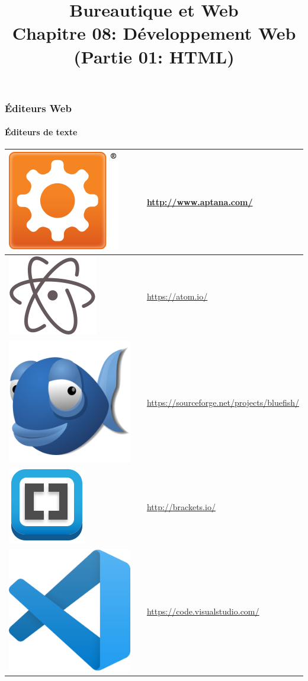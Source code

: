 \documentclass[xcolor=table]{beamer}
\title[BWEB: 08- Web (HTML)] %
{Bureautique et Web \\Chapitre 08: Développement Web (Partie 01: HTML)}
\begin{document}
\begin{frame}
\frametitle{Éditeurs Web}
\framesubtitle{Éditeurs de texte}

\def\arraystretch{0}

\begin{tabular}{p{}cp{}}%
	
	\hline
	
	\includegraphics[height=.8cm]{..//img/Bweb08-dev-web/aptana-logo.png} &
	& 
	\url{http://www.aptana.com/}\\
	
	\hline
	
	\includegraphics[height=.8cm]{..//img/Bweb08-dev-web/atom-logo.png} &
	& 
	\url{https://atom.io/}\\
	
	\hline
	
	\includegraphics[height=.8cm]{..//img/Bweb08-dev-web/bluefish-logo.png} &
	& 
	\url{https://sourceforge.net/projects/bluefish/}\\
	
	\hline
	
	\includegraphics[height=.8cm]{..//img/Bweb08-dev-web/brackets-logo.png} &
	& 
	\url{http://brackets.io/}\\
	
	\hline
	
	\includegraphics[height=.8cm]{..//img/Bweb08-dev-web/visual-studio-code-logo.png} &
	& 
	\url{https://code.visualstudio.com/}\\
	
	\hline
	
\end{tabular}

\end{frame}
\end{document}
